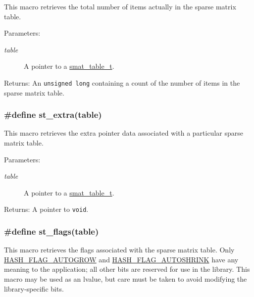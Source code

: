 This macro retrieves the total number of items actually in the sparse matrix table.

\begin{Desc}
\item[Parameters:]
\begin{description}
\item[{\em table}]A pointer to a \hyperlink{group__dbprim__smat_a0}{smat\_\-table\_\-t}.\end{description}
\end{Desc}
\begin{Desc}
\item[Returns:]An {\tt unsigned long} containing a count of the number of items in the sparse matrix table. \end{Desc}
\hypertarget{group__dbprim__smat_a26}{
\subsubsection[st\_\-extra]{\setlength{\rightskip}{0pt plus 5cm}\#define st\_\-extra(table)}}
\label{group__dbprim__smat_a26}


This macro retrieves the extra pointer data associated with a particular sparse matrix table.

\begin{Desc}
\item[Parameters:]
\begin{description}
\item[{\em table}]A pointer to a \hyperlink{group__dbprim__smat_a0}{smat\_\-table\_\-t}.\end{description}
\end{Desc}
\begin{Desc}
\item[Returns:]A pointer to {\tt void}. \end{Desc}
\hypertarget{group__dbprim__smat_a22}{
\subsubsection[st\_\-flags]{\setlength{\rightskip}{0pt plus 5cm}\#define st\_\-flags(table)}}
\label{group__dbprim__smat_a22}


This macro retrieves the flags associated with the sparse matrix table. Only \hyperlink{group__dbprim__hash_a16}{HASH\_\-FLAG\_\-AUTOGROW} and \hyperlink{group__dbprim__hash_a17}{HASH\_\-FLAG\_\-AUTOSHRINK} have any meaning to the application; all other bits are reserved for use in the library. This macro may be used as an lvalue, but care must be taken to avoid modifying the library-specific bits.

